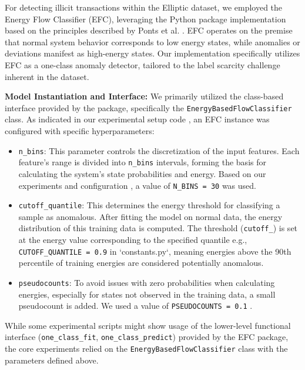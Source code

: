 \documentclass[12pt]{article}
\begin{document}
For detecting illicit transactions within the Elliptic dataset, we employed the Energy Flow Classifier (EFC), leveraging
the Python package implementation \cite{efc_package_github} based on the principles described by Ponts et al.
\cite{pontes2019, souza2022novelopensetenergybased}. EFC operates on the premise that normal system behavior corresponds
to low energy states, while anomalies or deviations manifest as high-energy states. Our implementation specifically
utilizes EFC as a one-class anomaly detector, tailored to the label scarcity challenge inherent in the dataset.

\textbf{Model Instantiation and Interface:} We primarily utilized the class-based interface provided by the package,
specifically the \texttt{EnergyBasedFlowClassifier} class. As indicated in our experimental setup code \cite{reproducibility},
an EFC instance was configured with specific hyperparameters:

\begin{itemize}
    \item \texttt{n\_bins}: This parameter controls the discretization of the input features. Each feature's range is
      divided into \texttt{n\_bins} intervals, forming the basis for calculating the system's state probabilities and
      energy. Based on our experiments and configuration \cite{reproducibility}, a value of \texttt{N\_BINS = 30} was used.
    \item \texttt{cutoff\_quantile}: This determines the energy threshold for classifying a sample as anomalous. After
      fitting the model on normal data, the energy distribution of this training data is computed. The threshold
      (\texttt{cutoff\_}) is set at the energy value corresponding to the specified quantile
      e.g., \texttt{CUTOFF\_QUANTILE = 0.9} in `constants.py`, meaning energies above the 90th percentile of training
      energies are considered potentially anomalous.
    \item \texttt{pseudocounts}: To avoid issues with zero probabilities when calculating energies, especially for states 
      not observed in the training data, a small pseudocount is added. We used a value of \texttt{PSEUDOCOUNTS = 0.1}
      \cite{reproducibility}.
\end{itemize}

While some experimental scripts might show usage of the lower-level functional interface
(\texttt{one\_class\_fit}, \texttt{one\_class\_predict}) provided by the EFC package, the core experiments relied on the
\texttt{EnergyBasedFlowClassifier} class with the parameters defined above.
\end{document}

